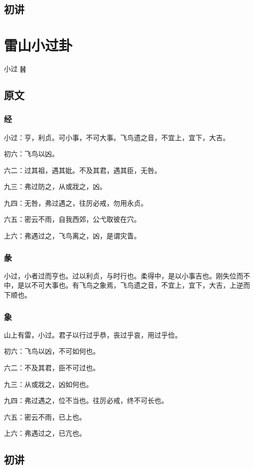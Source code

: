 \documentclass[12pt,oneside]{book}
\begin{document}
\section{初讲}


\chapter{雷山小过卦}
小过 {\LARGE ䷽}

\section{原文}
\subsection{经}
小过：亨，利贞。可小事，不可大事。飞鸟遗之音，不宜上，宜下，大吉。

初六：飞鸟以凶。

六二：过其祖，遇其妣。不及其君，遇其臣，无咎。

九三：弗过防之，从或戕之，凶。

九四：无咎，弗过遇之，往厉必戒，勿用永贞。

六五：密云不雨，自我西郊，公弋取彼在穴。

上六：弗遇过之，飞鸟离之，凶，是谓灾眚。

\subsection{彖}
小过，小者过而亨也。过以利贞，与时行也。柔得中，是以小事吉也。刚失位而不中，是以不可大事也。有飞鸟之象焉，飞鸟遗之音，不宜上，宜下，大吉，上逆而下顺也。

\subsection{象}
山上有雷，小过。君子以行过乎恭，丧过乎哀，用过乎俭。

初六：飞鸟以凶，不可如何也。

六二：不及其君，臣不可过也。

九三：从或戕之，凶如何也。

九四：弗过遇之，位不当也。往厉必戒，终不可长也。

六五：密云不雨，已上也。

上六：弗遇过之，已亢也。

\section{初讲}
\end{document}

